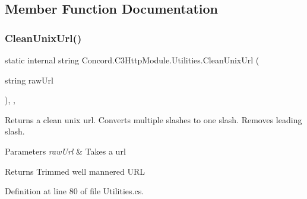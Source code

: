 \subsection{Member Function Documentation}
\mbox{\label{class_concord_1_1_c3_http_module_1_1_utilities_a5c66ffbfd1a9f0723be7b7163ce9f778}} 
\subsubsection{\texorpdfstring{CleanUnixUrl()}{CleanUnixUrl()}}
{\footnotesize\ttfamily static internal string Concord.\+C3\+Http\+Module.\+Utilities.\+Clean\+Unix\+Url (\begin{DoxyParamCaption}\item[{string}]{raw\+Url }\end{DoxyParamCaption})\hspace{0.3cm}{\ttfamily [inline]}, {\ttfamily [static]}, {\ttfamily [private]}}



Returns a clean unix url. Converts multiple slashes to one slash. Removes leading slash. 


\begin{DoxyParams}{Parameters}
{\em raw\+Url} & Takes a url\\
\hline
\end{DoxyParams}
\begin{DoxyReturn}{Returns}
Trimmed well mannered U\+RL
\end{DoxyReturn}


Definition at line 80 of file Utilities.\+cs.


